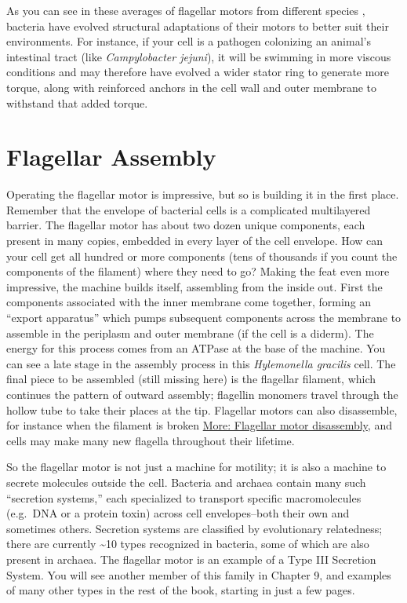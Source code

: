 \documentclass[]{tufte-book}
\begin{document}
As you can see in these averages of flagellar motors from different species \citep{murphy2006} \citep{chen2011} \citep{zhao2014} \citep{beeby2016} \citep{qin2017} \citep{chaban2018} \citep{kaplan2019} \citep{ferreira2019} \citep{chang2019}, bacteria have evolved structural adaptations of their motors to better suit their environments. For instance, if your cell is a pathogen colonizing an animal's intestinal tract (like \emph{Campylobacter jejuni}), it will be swimming in more viscous conditions and may therefore have evolved a wider stator ring to generate more torque, along with reinforced anchors in the cell wall and outer membrane to withstand that added torque.

\hypertarget{flagellar-assembly}{%
\section{Flagellar Assembly}\label{flagellar-assembly}}

Operating the flagellar motor is impressive, but so is building it in the first place. Remember that the envelope of bacterial cells is a complicated multilayered barrier. The flagellar motor has about two dozen unique components, each present in many copies, embedded in every layer of the cell envelope. How can your cell get all hundred or more components (tens of thousands if you count the components of the filament) where they need to go? Making the feat even more impressive, the machine builds itself, assembling from the inside out. First the components associated with the inner membrane come together, forming an ``export apparatus'' which pumps subsequent components across the membrane to assemble in the periplasm and outer membrane (if the cell is a diderm). The energy for this process comes from an ATPase at the base of the machine. You can see a late stage in the assembly process in this \emph{Hylemonella gracilis} cell. The final piece to be assembled (still missing here) is the flagellar filament, which continues the pattern of outward assembly; flagellin monomers travel through the hollow tube to take their places at the tip. Flagellar motors can also disassemble, for instance when the filament is broken \protect\hyperlink{Flagellar_motor_disassembly}{More: Flagellar motor disassembly}, and cells may make many new flagella throughout their lifetime.

So the flagellar motor is not just a machine for motility; it is also a machine to secrete molecules outside the cell. Bacteria and archaea contain many such ``secretion systems,'' each specialized to transport specific macromolecules (e.g.~DNA or a protein toxin) across cell envelopes--both their own and sometimes others. Secretion systems are classified by evolutionary relatedness; there are currently \textasciitilde{}10 types recognized in bacteria, some of which are also present in archaea. The flagellar motor is an example of a Type III Secretion System. You will see another member of this family in Chapter 9, and examples of many other types in the rest of the book, starting in just a few pages.
\end{document}
